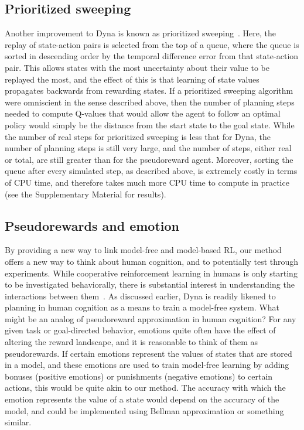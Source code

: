 \documentclass[letterpaper]{article}
\begin{document}
\subsection{Prioritized sweeping}

Another improvement to Dyna is known as prioritized sweeping~\cite{moore1993prioritized}. Here, the replay of state-action pairs is selected from the top of a queue, where the queue is sorted in descending order by the temporal difference error from that state-action pair. This allows states with the most uncertainty about their value to be replayed the most, and the effect of this is that learning of state values propagates backwards from rewarding states. If a prioritized sweeping algorithm were omniscient in the sense described above, then the number of planning steps needed to compute Q-values that would allow the agent to follow an optimal policy would simply be the distance from the start state to the goal state. While the number of real steps for prioritized sweeping is less that for Dyna, the number of planning steps is still very large, and the number of steps, either real or total, are still greater than for the pseudoreward agent. Moreover, sorting the queue after every simulated step, as described above, is extremely costly in terms of CPU time, and therefore takes much more CPU time to compute in practice (see the Supplementary Material for results).

\subsection{Pseudorewards and emotion}

By providing a new way to link model-free and model-based RL, our method offers a new way to think about human cognition, and to potentially test through experiments. While cooperative reinforcement learning in humans is only starting to be investigated behaviorally, there is substantial interest in understanding the interactions between them~\cite{daw2014algorithmic}. As discussed earlier, Dyna is readily likened to planning in human cognition as a means to train a model-free system. What might be an analog of pseudoreward approximation in human cognition? For any given task or goal-directed behavior, emotions quite often have the effect of altering the reward landscape, and it is reasonable to think of them as pseudorewards. If certain emotions represent the values of states that are stored in a model, and these emotions are used to train model-free learning by adding bonuses (positive emotions) or punishments (negative emotions) to certain actions, this would be quite akin to our method. The accuracy with which the emotion represents the value of a state would depend on the accuracy of the model, and could be implemented using Bellman approximation or something similar.
\end{document}
